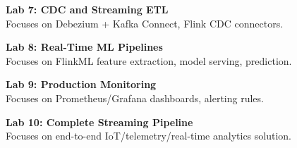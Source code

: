 \noindent\textbf{Lab 7: CDC and Streaming ETL} \\
Focuses on Debezium + Kafka Connect, Flink CDC connectors.

\vspace{0.2cm}

\noindent\textbf{Lab 8: Real-Time ML Pipelines} \\
Focuses on FlinkML feature extraction, model serving, prediction.

\vspace{0.2cm}

\noindent\textbf{Lab 9: Production Monitoring} \\
Focuses on Prometheus/Grafana dashboards, alerting rules.

\vspace{0.2cm}

\noindent\textbf{Lab 10: Complete Streaming Pipeline} \\
Focuses on end-to-end IoT/telemetry/real-time analytics solution.

\vspace{0.2cm}

\newpage
{}
